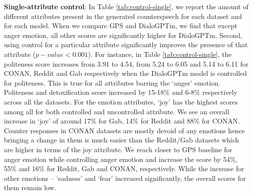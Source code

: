 \noindent\textbf{Single-attribute control}: In Table \ref{tab:control-single}, we report the amount of different attributes present in the generated counterspeech for each dataset and for each model. When we compare GPS and DialoGPTm, we find that except anger emotion, all other scores are significantly higher for DialoGPTm. Second, using control for a particular attribute significantly improves the presence of that attribute ($p-value <0.001$). For instance, in Table \ref{tab:control-single}, the politeness score increases from 3.91 to 4.54, from 5.24 to 6.05 and 5.14 to 6.11 for CONAN, Reddit and Gab respectively when the DialoGPTm model is controlled for politeness. This is true for all attributes barring the `anger' emotion. Politeness and detoxification score increased by 15-18\% and 6-8\% respectively across all the datasets. For the emotion attributes, `joy' has the highest scores among all for both controlled and uncontrolled attribute. We see an overall increase in `joy' of around 17\% for Gab, 14\% for Reddit and 88\% for CONAN. Counter responses in CONAN datasets are mostly devoid of any emotions hence bringing a change in them is much easier than the Reddit/Gab datasets which are higher in terms of the joy attribute. We reach closer to GPS baseline for anger emotion while controlling anger emotion and increase the score by 54\%, 55\% and 16\% for Reddit, Gab and CONAN, respectively. While the increase for other emotions -- `sadness' and `fear' increased significantly, the overall scores for them remain low.


